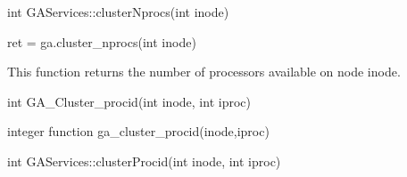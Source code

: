 \documentclass[10pt]{article}
\begin{document}
\begin{cxxapi}
\begin{cxxcode}
int GAServices::clusterNprocs(int inode)
\end{cxxcode}
\begin{funcargs}
\end{funcargs}
\end{cxxapi}

\begin{pyapi}
\begin{pycode}
ret = ga.cluster_nprocs(int inode)
\end{pycode}
\begin{funcargs}
\end{funcargs}
\end{pyapi}

\local

\begin{desc}

This function returns the number of processors available on node inode.

\end{desc}


\begin{capi}
\begin{ccode}
int GA_Cluster_procid(int inode, int iproc)
\end{ccode}
\begin{funcargs}
\end{funcargs}
\end{capi}

\begin{fapi}
\begin{fcode}
integer function ga_cluster_procid(inode,iproc)
\end{fcode}
\begin{funcargs}
\end{funcargs}
\end{fapi}

\begin{cxxapi}
\begin{cxxcode}
int GAServices::clusterProcid(int inode, int iproc)
\end{cxxcode}
\begin{funcargs}
\end{funcargs}
\end{cxxapi}
\end{document}
